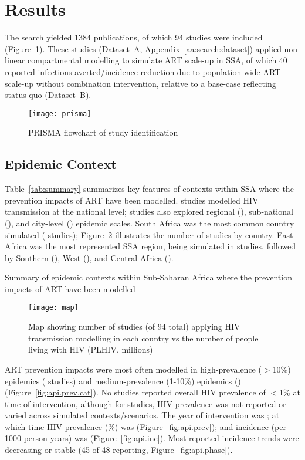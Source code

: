 \section{Results}
\label{s:res}
The search yielded 1384 publications,
of which 94 studies were included (Figure~\ref{fig:prisma}).
These studies (Dataset~A, Appendix~\ref{aa:search:dataset})
applied non-linear compartmental modelling to simulate ART scale-up in SSA,
of which 40 reported infections averted/incidence reduction
due to population-wide ART scale-up without combination intervention,
relative to a base-case reflecting status quo (Dataset~B).
\begin{figure}
  \centering
  \texttt{[image: prisma]}
  \caption{PRISMA flowchart of study identification}
  \label{fig:prisma}
\end{figure}
\subsection{Epidemic Context}
\label{ss:res:context}
Table~\ref{tab:summary} summarizes key features of contexts within SSA
where the prevention impacts of ART have been modelled.
 studies modelled HIV transmission at the national level;
studies also explored
regional (),
sub-national (), and
city-level () epidemic scales.
South Africa was the most common country simulated ( studies);
Figure~\ref{fig:map} illustrates the number of studies by country.
East Africa was the most represented SSA region, being simulated in  studies,
followed by Southern (), West (), and Central Africa ().
\begin{table}
  \centering
  \caption{Summary of epidemic contexts within Sub-Saharan Africa where
    the prevention impacts of ART have been modelled}
  \label{tab:summary}
  
\end{table}
\begin{figure}
  \centering
  \texttt{[image: map]}
  \caption{Map showing number of studies (of 94 total)
    applying HIV transmission modelling in each country vs
    the number of people living with HIV (PLHIV, millions)}
  \label{fig:map}
\end{figure}
\par
ART prevention impacts were most often modelled in
high-prevalence ({$>$10\%}) epidemics ( studies) and
medium-prevalence ({1-10\%}) epidemics () (Figure~\ref{fig:api.prev.cat}).
No studies reported overall HIV prevalence of {$<$1\%} at time of intervention,
although for  studies, HIV prevalence was
not reported or varied across simulated contexts/scenarios.
The \xdmdef year of intervention was ; at which time
HIV prevalence (\%) was  (Figure~\ref{fig:api.prev}); and
incidence (per 1000 person-years) was  (Figure~\ref{fig:api.inc}).
Most reported incidence trends were decreasing or stable
(45 of 48 reporting, Figure~\ref{fig:api.phase}). %
